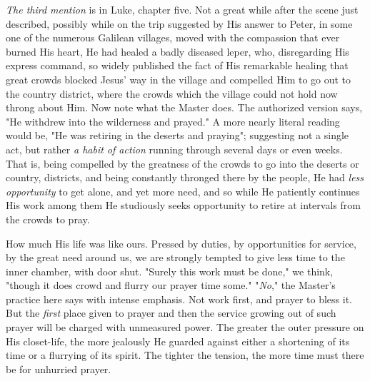\textit{The third mention} is in Luke, chapter five. Not a great while after the
scene just described, possibly while on the trip suggested by His answer
to Peter, in some one of the numerous Galilean villages, moved with the
compassion that ever burned His heart, He had healed a badly diseased
leper, who, disregarding His express command, so widely published the fact
of His remarkable healing that great crowds blocked Jesus' way in the
village and compelled Him to go out to the country district, where the
crowds which the village could not hold now throng about Him. Now note
what the Master does. The authorized version says, "He withdrew into the
wilderness and prayed." A more nearly literal reading would be, "He was
retiring in the deserts and praying"; suggesting not a single act, but
rather \textit{a habit of action} running through several days or even weeks.
That is, being compelled by the greatness of the crowds to go into the
deserts or country, districts, and being constantly thronged there by the
people, He had \textit{less opportunity} to get alone, and yet more need, and so
while He patiently continues His work among them He studiously seeks
opportunity to retire at intervals from the crowds to pray.

How much His life was like ours. Pressed by duties, by opportunities for
service, by the great need around us, we are strongly tempted to give less
time to the inner chamber, with door shut. "Surely this work must be
done," we think, "though it does crowd and flurry our prayer time some."
"\textit{No}," the Master's practice here says with intense emphasis. Not work
first, and prayer to bless it. But the \textit{first} place given to prayer and
then the service growing out of such prayer will be charged with
unmeasured power. The greater the outer pressure on His closet-life, the
more jealously He guarded against either a shortening of its time or a
flurrying of its spirit. The tighter the tension, the more time must there
be for unhurried prayer.

